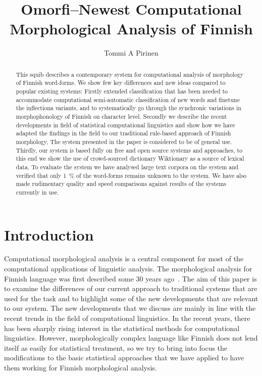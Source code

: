 \documentclass[a4paper,12pt]{article}
\title{Omorfi–Newest Computational Morphological Analysis of Finnish}
\author{Tommi A Pirinen}
\begin{document}
\maketitle

\begin{abstract}

    This squib describes a contemporary system for computational analysis of
    morphology of Finnish word-forms. We show few key differences and new
    ideas compared to popular existing systems: Firstly extended classification
    that has been needed to
    accommodate computational semi-automatic classification of new words and
    finetune the inflectiona variants, and to systematically go through the
    synchronic variations in morphophonology of Finnish on character level.
    Secondly we describe the recent developments in field of statistical
    computational linguistics and show how we have adapted the findings in
    the field to our traditional rule-based approach of Finnish morphology,
    The system presented in the paper is considered to be of general use. 
    Thirdly, our system is based fully on free and open source systems and
    approaches, to this end we show the use of crowd-sourced dictionary 
    Wiktionary as a source of lexical data. To
    evaluate the system we have analysed large text corpora on the system
    and verified that only 1~\% of the word-forms remains unknown to the system.
    We have also made rudimentary quality and speed 
    comparisons against results of the systems currently in use.

\end{abstract}

\section{Introduction}

Computational morphological analysis is a central component for most of the
computational applications of linguistic analysis. The morphological analysis
for Finnish language was first described some 30 years ago~\cite{}. The
aim of this paper is to examine the differences of our current approach to
traditional systems that are used for the task and to highlight some of the new
developments that are relevant to our system. The new developments that we
discuss are mainly in line with the recent trends in the field of computational
linguistics. In the recent years, there has been sharply rising interest in the
statistical methods for computational linguistics. However, morphologically
complex language like Finnish does not lend itself as easily for statistical
treatment, so we try to bring into focus the modifications to the basic
statistical approaches that we have applied to have them working for Finnish
morphological analysis. 
\end{document}

